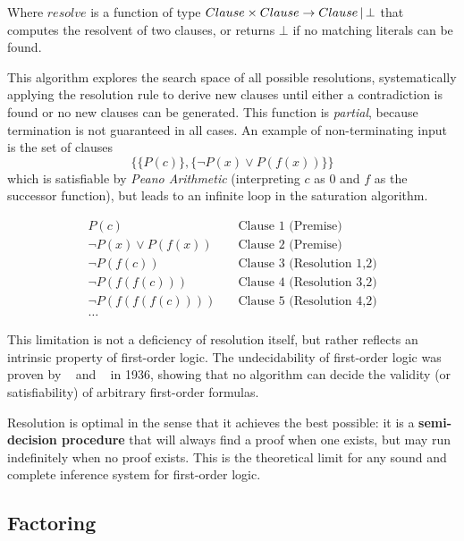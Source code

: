 Where \(resolve\) is a function of type \(Clause \times Clause \to Clause\, |\, \bot\) that computes the resolvent of two clauses, or returns \(\bot\) if no matching literals can be found.

This algorithm explores the search space of all possible resolutions, systematically applying the resolution rule to derive new clauses until either a contradiction is found or no new clauses can be generated.
This function is \emph{partial}, because termination is not guaranteed in all cases.
An example of non-terminating input is the set of clauses
\begin{equation}\label{eq:non_terminating}
  \{ \{P(c)\}, \{\neg P(x) \lor P(f(x))\} \}
\end{equation}
which is satisfiable by \emph{Peano Arithmetic} (interpreting \(c\) as \(0\) and \(f\) as the successor function), but leads to an infinite loop in the saturation algorithm.

\begin{equation}
   \begin{aligned}
    P(c) &\quad \text{Clause 1 (Premise)} \\
    \neg P(x) \lor P(f(x)) &\quad \text{Clause 2 (Premise)} \\
    \neg P(f(c)) &\quad \text{Clause 3 (Resolution 1,2)} \\
    \neg P(f(f(c))) &\quad \text{Clause 4 (Resolution 3,2)} \\
    \neg P(f(f(f(c)))) &\quad \text{Clause 5 (Resolution 4,2)}\\
    \ldots
  \end{aligned}
\end{equation}

This limitation is not a deficiency of resolution itself, but rather reflects an intrinsic property of first-order logic. The undecidability of first-order logic was proven by \citeauthor{church1936}~\cite{church1936} and \citeauthor{turing1936}~\cite{turing1936} in 1936, showing that no algorithm can decide the validity (or satisfiability) of arbitrary first-order formulas.

Resolution is optimal in the sense that it achieves the best possible: it is a \textbf{semi-decision procedure} that will always find a proof when one exists, but may run indefinitely when no proof exists. This is the theoretical limit for any sound and complete inference system for first-order logic.

\subsection{Factoring}

